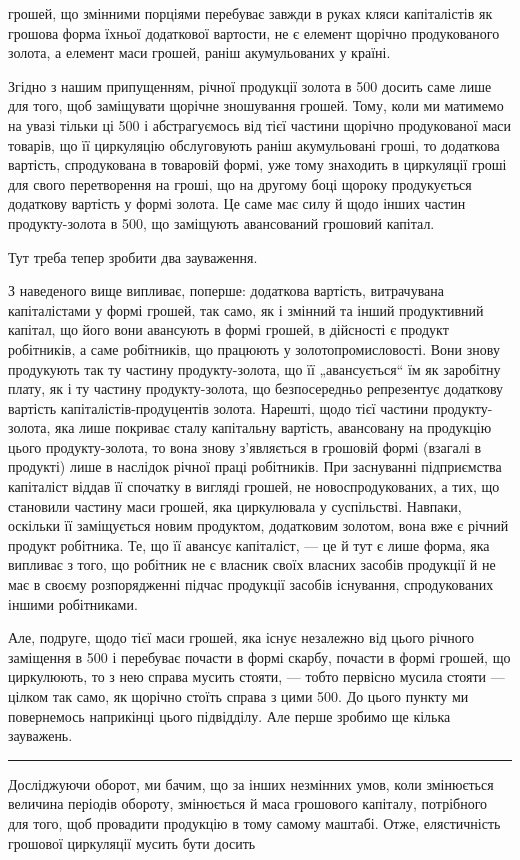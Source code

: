 \parcont{}  %
грошей, що змінними порціями перебуває завжди в руках кляси капіталістів
як грошова форма їхньої додаткової вартости, не є елемент
щорічно продукованого золота, а елемент маси грошей, раніш акумульованих
у країні.

Згідно з нашим припущенням, річної продукції золота в 500
досить саме лише для того, щоб заміщувати щорічне зношування грошей.
Тому, коли ми матимемо на увазі тільки ці 500 і абстрагуємось
від тієї частини щорічно продукованої маси товарів, що її циркуляцію
обслуговують раніш акумульовані гроші, то додаткова вартість, спродукована
в товаровій формі, уже тому знаходить в циркуляції гроші для
свого перетворення на гроші, що на другому боці щороку продукується
додаткову вартість у формі золота. Це саме має силу й щодо інших частин
продукту-золота в 500, що заміщують авансований грошовий
капітал.

Тут треба тепер зробити два зауваження.

З наведеного вище випливає, поперше: додаткова вартість, витрачувана
капіталістами у формі грошей, так само, як і змінний та інший
продуктивний капітал, що його вони авансують в формі грошей, в
дійсності є продукт робітників, а саме робітників, що працюють у
золотопромисловості. Вони знову продукують так ту частину продукту-золота,
що її „авансується“ їм як заробітну плату, як і ту частину
продукту-золота, що безпосередньо репрезентує додаткову вартість
капіталістів-продуцентів золота. Нарешті, щодо тієї частини продукту-золота,
яка лише покриває сталу капітальну вартість, авансовану на
продукцію цього продукту-золота, то вона знову з’являється в грошовій
формі (взагалі в продукті) лише в наслідок річної праці робітників.
При заснуванні підприємства капіталіст віддав її спочатку в вигляді
грошей, не новоспродукованих, а тих, що становили частину маси грошей,
яка циркулювала у суспільстві. Навпаки, оскільки її заміщується новим
продуктом, додатковим золотом, вона вже є річний продукт робітника.
Те, що її авансує капіталіст, — це й тут є лише форма, яка випливає з
того, що робітник не є власник своїх власних засобів продукції й не
має в своєму розпорядженні підчас продукції засобів існування, спродукованих
іншими робітниками.

Але, подруге, щодо тієї маси грошей, яка існує незалежно від цього
річного заміщення в 500 і перебуває почасти в формі скарбу,
почасти в формі грошей, що циркулюють, то з нею справа мусить
стояти, — тобто первісно мусила стояти — цілком так само, як щорічно
стоїть справа з цими 500. До цього пункту ми повернемось
наприкінці цього підвідділу. Але перше зробимо ще кілька зауважень.

\pfbreak

Досліджуючи оборот, ми бачим, що за інших незмінних умов, коли
змінюється величина періодів обороту, змінюється й маса грошового
капіталу, потрібного для того, щоб провадити продукцію в тому самому
маштабі. Отже, елястичність грошової циркуляції мусить бути досить
\parbreak{}  %
